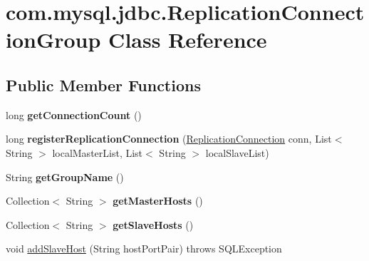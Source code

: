 \hypertarget{classcom_1_1mysql_1_1jdbc_1_1_replication_connection_group}{}\section{com.\+mysql.\+jdbc.\+Replication\+Connection\+Group Class Reference}
\label{classcom_1_1mysql_1_1jdbc_1_1_replication_connection_group}
\subsection*{Public Member Functions}
\begin{DoxyCompactItemize}
\item 
\mbox{\label{classcom_1_1mysql_1_1jdbc_1_1_replication_connection_group_a26227ff0a3921c41cd2df3c126eadd0e}} 
long {\bfseries get\+Connection\+Count} ()
\item 
\mbox{\label{classcom_1_1mysql_1_1jdbc_1_1_replication_connection_group_a212f469500dc509f3f1ccc230c91eb1b}} 
long {\bfseries register\+Replication\+Connection} (\mbox{\hyperlink{interfacecom_1_1mysql_1_1jdbc_1_1_replication_connection}{Replication\+Connection}} conn, List$<$ String $>$ local\+Master\+List, List$<$ String $>$ local\+Slave\+List)
\item 
\mbox{\label{classcom_1_1mysql_1_1jdbc_1_1_replication_connection_group_a2d9d1b4ff7a1c09c23068c4c28ba6ffd}} 
String {\bfseries get\+Group\+Name} ()
\item 
\mbox{\label{classcom_1_1mysql_1_1jdbc_1_1_replication_connection_group_a339544179cf08d6ad2bb27d7afc33321}} 
Collection$<$ String $>$ {\bfseries get\+Master\+Hosts} ()
\item 
\mbox{\label{classcom_1_1mysql_1_1jdbc_1_1_replication_connection_group_af4bc61184b16d79fd6178a9723c9dc31}} 
Collection$<$ String $>$ {\bfseries get\+Slave\+Hosts} ()
\item 
void \mbox{\hyperlink{classcom_1_1mysql_1_1jdbc_1_1_replication_connection_group_a8e01912c5eb8fa7845a475ad9304ad1d}{add\+Slave\+Host}} (String host\+Port\+Pair)  throws S\+Q\+L\+Exception 

\end{DoxyCompactItemize}
